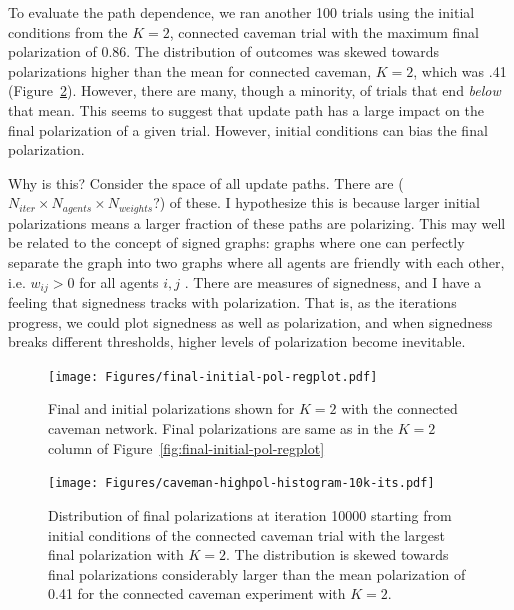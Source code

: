 \documentclass[11pt,letterpaper]{article}
\begin{document}
To evaluate the path dependence, we ran another 100 trials using the initial
conditions from the $K=2$, connected caveman trial
with the maximum final polarization of 0.86. The distribution of outcomes was
skewed towards polarizations higher than the mean for connected caveman, $K=2$,
which was .41 (Figure~\ref{fig:highpol-histogram}). However, there are many,
though a minority, of trials that end \emph{below} that mean. This seems to
suggest that update path has a large impact on the final polarization of a
given trial. However, initial conditions can bias the final polarization. 

Why is this? Consider the space of all update paths. 
There are ($N_{iter} \times N_{agents} \times N_{weights}$?) of these.
I hypothesize this is because larger initial polarizations means a larger
fraction of these paths are polarizing. This may well be related to the 
concept of signed graphs: graphs where one can perfectly separate the graph
into two graphs where all agents are friendly with each other, i.e. 
$w_{ij} > 0$ for all agents $i,j$ \cite{Altafini2012}. There are measures of
signedness, and I have a feeling that signedness tracks with polarization.
That is, as the iterations progress, we could plot signedness as well as 
polarization, and when signedness breaks different thresholds, higher levels of
polarization become inevitable.

\begin{figure}[h!]
  \centering
    \texttt{[image: Figures/final-initial-pol-regplot.pdf]}
  \caption{Final and initial polarizations shown for $K=2$ with the connected 
    caveman network. Final polarizations are same as in the $K=2$ column of 
    Figure~\ref{fig:final-initial-pol-regplot}}
  \label{fig:average-trial-caveman-over-k}
\end{figure}

\begin{figure}[h!]
  \centering
    \texttt{[image: Figures/caveman-highpol-histogram-10k-its.pdf]}
  \caption{Distribution of final polarizations at iteration 10000
  starting from initial conditions
  of the connected caveman trial with the largest final polarization with $K=2$.
  The distribution is skewed towards final polarizations considerably larger
  than the mean polarization of 0.41 for the connected caveman experiment
  with $K=2$. 
  }
  \label{fig:highpol-histogram}
\end{figure}



\end{document}
